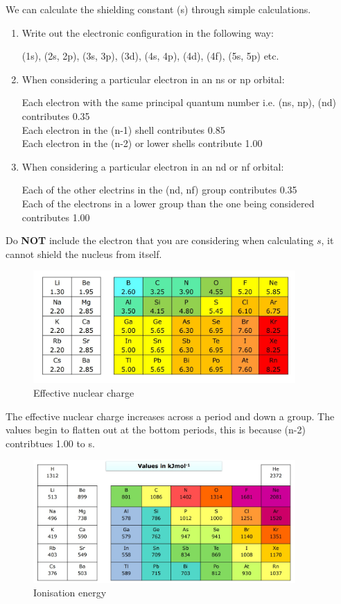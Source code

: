 \documentclass{article}
\newcommand{\NB}{{\large\lefthand}\quad}
\begin{document}
    We can calculate the shielding constant (s) through simple calculations. 
    \begin{enumerate}
        \item Write out the electronic configuration in the following way:
        
        (1s), (2s, 2p), (3s, 3p), (3d), (4s, 4p), (4d), (4f), (5s, 5p) etc.

        \item When considering a particular electron in an ns or np orbital:
        
        Each electron with the same principal quantum number i.e. (ns, np), (nd) contributes 0.35\\
        Each electron in the (n-1) shell contributes 0.85\\
        Each electron in the (n-2) or lower shells contribute 1.00 

        \item When considering a particular electron in an nd or nf orbital:
        
        Each of the other electrins in the (nd, nf) group contributes 0.35\\
        Each of the electrons in a lower group than the one being considered contributes 1.00\\
    \end{enumerate}
    \NB Do \textbf{NOT} include the electron that you are considering when calculating \(s\), it cannot shield the
    nucleus from itself.

    \begin{figure}[h]
        \centering
        \includegraphics[width=10cm]{eff.jpg}
        \caption{Effective nuclear charge}
    \end{figure}

    The effective nuclear charge increases across a period and down a group. The values begin to flatten out at
    the bottom periods, this is because (n-2) contribtues 1.00 to s. 
    \newpage
    \begin{figure}[h]
        \centering
        \includegraphics[width=10cm]{ionisation energy.jpg}
        \caption{Ionisation energy}
    \end{figure}
\end{document}

